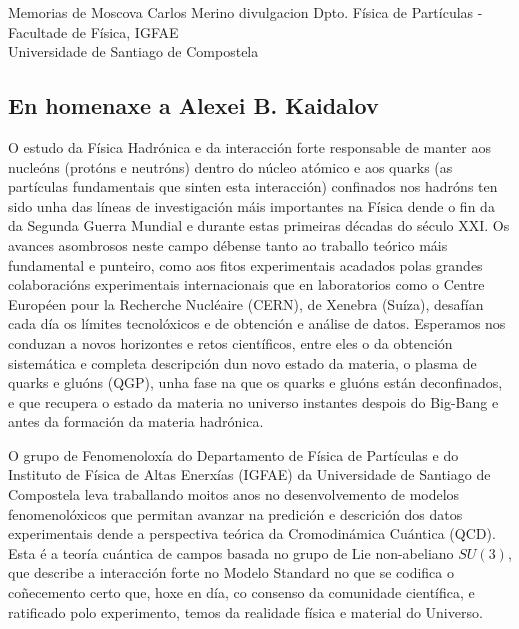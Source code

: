 \Titular%
{Memorias de Moscova}%
{Carlos Merino}%
{divulgacion}%
{Dpto. Física de Partículas - Facultade de Física, IGFAE\\
Universidade de Santiago de Compostela}%

\begin{refsection}
\begin{multicols}{2}

\subsection*{En homenaxe a Alexei B. Kaidalov}

O estudo da Física Hadrónica e da interacción forte responsable de manter aos nucleóns (protóns e neutróns) dentro do núcleo atómico e aos quarks (as partículas fundamentais que sinten esta interacción) confinados nos hadróns ten sido unha das líneas de investigación máis importantes na Física dende o fin da da Segunda Guerra Mundial e durante estas primeiras décadas do século XXI. Os avances asombrosos neste campo débense tanto ao traballo teórico máis fundamental e punteiro, como aos fitos experimentais acadados polas grandes colaboracións experimentais internacionais que en laboratorios como o Centre Européen pour la Recherche Nucléaire (CERN), de Xenebra (Suíza), desafían cada día os límites tecnolóxicos e de obtención e análise de datos. Esperamos nos conduzan a novos horizontes e retos científicos, entre eles o da obtención sistemática e completa descripción dun novo estado da materia, o plasma de quarks e gluóns (QGP), unha fase na que os quarks e gluóns están deconfinados, e que recupera o estado da materia no universo instantes despois do Big-Bang e antes da formación da materia hadrónica.

O grupo de Fenomenoloxía do Departamento de Física de Partículas e do Instituto de Física de Altas Enerxías (IGFAE) da Universidade de Santiago de Compostela leva traballando moitos anos no desenvolvemento de modelos fenomenolóxicos que permitan avanzar na predición e descrición dos datos experimentais dende a perspectiva teórica da Cromodinámica Cuántica (QCD). Esta é a teoría cuántica de campos basada no grupo de Lie non-abeliano $SU(3)$, que describe a interacción forte no Modelo Standard no que se codifica o coñecemento certo que, hoxe en día, co consenso da comunidade científica, e ratificado polo experimento, temos da realidade física e material do Universo.


\end{multicols}
\end{refsection}

